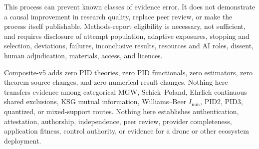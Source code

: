 \documentclass[11pt,a4paper]{article}
\begin{document}
This process can prevent known classes of evidence error. It does not demonstrate a causal
improvement in research quality, replace peer review, or make the process itself publishable.
Methods-report eligibility is necessary, not sufficient, and requires disclosure of attempt
population, adaptive exposures, stopping and selection, deviations, failures, inconclusive results,
resources and AI roles, dissent, human adjudication, materials, access, and licences.

Composite-v5 adds zero PID theories, zero PID functionals, zero estimators, zero theorem-source
changes, and zero numerical-result changes. Nothing here transfers evidence among categorical MGW,
Schick--Poland, Ehrlich continuous shared exclusions, KSG mutual information, Williams--Beer
\(I_{\min}\), PID2, PID3, quantized, or mixed-support routes. Nothing here establishes
authentication, attestation, authorship, independence, peer review, provider completeness,
application fitness, control authority, or evidence for a drone or other ecosystem deployment.
\end{document}

